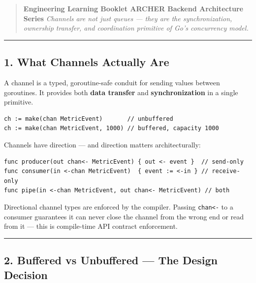 \documentclass[11pt,a4paper,oneside]{book}
\begin{document}
\begin{quote}
\textbf{Engineering Learning Booklet \textbar{} ARCHER Backend
Architecture Series} \emph{Channels are not just queues --- they are the
synchronization, ownership transfer, and coordination primitive of Go's
concurrency model.}
\end{quote}

\begin{center}\rule{0.5\linewidth}{0.5pt}\end{center}

\subsection{1. What Channels Actually
Are}

A channel is a typed, goroutine-safe conduit for sending values between
goroutines. It provides both \textbf{data transfer} and
\textbf{synchronization} in a single primitive.

\begin{verbatim}
ch := make(chan MetricEvent)       // unbuffered
ch := make(chan MetricEvent, 1000) // buffered, capacity 1000
\end{verbatim}

Channels have direction --- and direction matters architecturally:

\begin{verbatim}
func producer(out chan<- MetricEvent) { out <- event }  // send-only
func consumer(in <-chan MetricEvent)  { event := <-in } // receive-only
func pipe(in <-chan MetricEvent, out chan<- MetricEvent) // both
\end{verbatim}

Directional channel types are enforced by the compiler. Passing
\texttt{chan\textless{}-} to a consumer guarantees it can never close
the channel from the wrong end or read from it --- this is compile-time
API contract enforcement.

\begin{center}\rule{0.5\linewidth}{0.5pt}\end{center}

\subsection{2. Buffered vs Unbuffered --- The Design
Decision}
\end{document}
